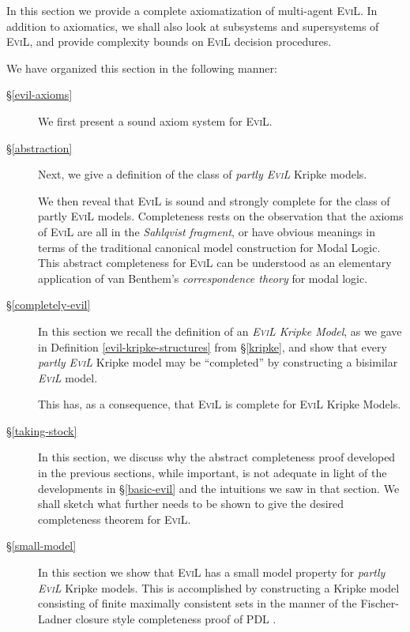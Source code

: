 In this section we provide a complete axiomatization of
multi-agent \textsc{EviL}.  In addition to axiomatics, we shall also
look at subsystems and supersystems of \textsc{EviL}, and provide
complexity bounds on \textsc{EviL} decision procedures. 

We have organized this section in the following manner:
\begin{description}
 \item[\S\ref{evil-axioms}] We first present a sound axiom
   system for \textsc{EviL}.

 \item[\S\ref{abstraction}] Next, we give a definition of the
   class of \emph{partly \textsc{EviL}} Kripke models.  

   We then reveal that \textsc{EviL} is sound and strongly complete
   for the class of partly \textsc{EviL} models. 
   Completeness rests on the observation that the
   axioms of \textsc{EviL} are all in the \emph{Sahlqvist fragment},
   or have obvious meanings in terms of the traditional canonical
   model construction for Modal Logic.
   This abstract completeness for \textsc{EviL} can be understood as
   an elementary application of van Benthem's 
   \emph{correspondence theory} for modal logic.

\item[\S\ref{completely-evil}]  In this section we recall the definition of an
  \emph{\textsc{EviL} Kripke Model}, as we gave in Definition
  \ref{evil-kripke-structures} from \S\ref{kripke}, and show that
  every \emph{partly \textsc{EviL}} Kripke model may be
  ``completed'' by constructing a bisimilar \emph{\textsc{EviL}} 
   model.

   This has, as a consequence, that \textsc{EviL} is complete for
   \textsc{EviL} Kripke Models.

\item[\S\ref{taking-stock}]  In this section, we discuss why the abstract
  completeness proof developed in the previous sections, while
  important, is not adequate in light of the developments in
  \S\ref{basic-evil} and the intuitions we saw in that section.  We
  shall sketch what further needs to be shown to give the desired
  completeness theorem for \textsc{EviL}.

\item[\S\ref{small-model}]  In this section we show that
  \textsc{EviL} has a small model property for \emph{partly
    \textsc{EviL}} Kripke models. This is accomplished by constructing
     a Kripke model consisting of finite maximally
     consistent sets in the manner of the Fischer-Ladner closure style
     completeness proof of PDL 
     \cite[chapter 4, pgs. 241--248]{blackburn_modal_2001}.


\end{description}
